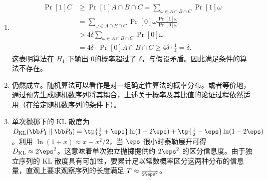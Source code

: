 \begin{solution}
\begin{enumerate}
        \item 
        \begin{align*}
            \Pr[1]{C} &\ge \Pr[1]{A \cap B \cap C} = \sum_{\omega \in A \cap B \cap C} \Pr[1]{\omega} \\
            &= \sum_{\omega \in A \cap B \cap C} \Pr[0]{\omega} \frac{\Pr[1]{\omega}}{\Pr[0]{\omega}} \\
            &> 4\delta \sum_{\omega \in A \cap B \cap C} \Pr[0]{\omega} \\
            &= 4\delta \cdot \Pr[0]{A \cap B \cap C} \ge 4\delta \cdot \frac{1}{4} = \delta.
        \end{align*}
        这表明算法在 $H_1$ 下输出 $0$的概率超过了 $\delta$，与假设矛盾。因此满足条件的算法不存在。
        \item 仍然成立。随机算法可以看作是对一组确定性算法的概率分布。或者等价地，通过预先生成随机数序列将其耦合，上述关于概率及其比值的论证过程依然适用（在给定随机数序列的条件下）。
    \item 单次抛掷下的 KL 散度为 $D_{\text{KL}}(\bb P_1 \parallel \bb P_0) = \tp{\frac{1}{2}+\eps}\ln(1+2\eps) + \tp{\frac{1}{2}-\eps}\ln(1-2\eps)$。利用 $\ln(1+x)\approx x - x^2/2$，当 $\eps$ 很小时泰勒展开可得 $D_{\text{KL}} \approx 2\eps^2$。这意味着单次独立抛掷提供约 $2\eps^2$ 的区分信息度。由于独立序列的 KL 散度具有可加性，要累计足以常数概率区分这两种分布的信息量，直观上要求观察序列的长度满足 $T \approx \frac{1}{2\eps^2}$。
    \end{enumerate}
\end{solution}

